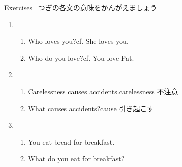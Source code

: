 \documentclass[aspectratio=169,xcolor={dvipsnames,table}]{beamer}
\begin{document}
\begin{frame}[plain]{Exercises}
\textdbend\,\,\,つぎの各文の意味をかんがえましょう

\begin{enumerate}
 \item \begin{enumerate}
		  \item Who loves you?\hfill{}cf. She loves you.
		  \item Who do you love?\hfill{}cf. You love Pat. 
		 \end{enumerate}
 \item \begin{enumerate}
	\item Carelessness causes accidents.\hfill{\scriptsize carelessness  不注意}
	\item What causes accidents?\hfill{\scriptsize cause  引き起こす}
       \end{enumerate}
 \item \begin{enumerate}
	\item You eat bread for breakfast.
	\item What do you eat for breakfast?
       \end{enumerate}
\end{enumerate}
\hfill{\scriptsize {}}

\end{frame}
\end{document}
